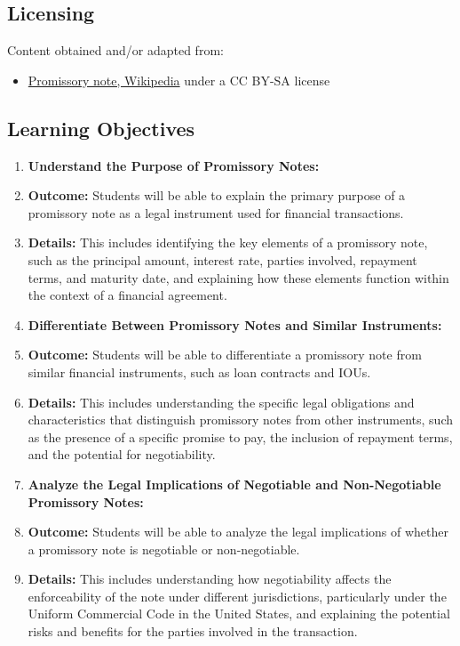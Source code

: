 \subsection{Licensing}
\label{sss:lice-7352}




Content obtained and/or adapted from:



\begin{itemize}
    \item \href{https://en.wikipedia.org/wiki/Promissory_note}{Promissory note, Wikipedia} under a CC BY-SA license
\end{itemize}


\subsection{Learning Objectives}
\label{ssec:lear-fe6e}


\begin{enumerate}
    \item \textbf{Understand the Purpose of Promissory Notes:}
    \item \textbf{Outcome:} Students will be able to explain the primary purpose of a promissory note as a legal instrument used for financial transactions.
    \item \textbf{Details:} This includes identifying the key elements of a promissory note, such as the principal amount, interest rate, parties involved, repayment terms, and maturity date, and explaining how these elements function within the context of a financial agreement.
    \item \textbf{Differentiate Between Promissory Notes and Similar Instruments:}
    \item \textbf{Outcome:} Students will be able to differentiate a promissory note from similar financial instruments, such as loan contracts and IOUs.
    \item \textbf{Details:} This includes understanding the specific legal obligations and characteristics that distinguish promissory notes from other instruments, such as the presence of a specific promise to pay, the inclusion of repayment terms, and the potential for negotiability.
    \item \textbf{Analyze the Legal Implications of Negotiable and Non-Negotiable Promissory Notes:}
    \item \textbf{Outcome:} Students will be able to analyze the legal implications of whether a promissory note is negotiable or non-negotiable.
    \item \textbf{Details:} This includes understanding how negotiability affects the enforceability of the note under different jurisdictions, particularly under the Uniform Commercial Code in the United States, and explaining the potential risks and benefits for the parties involved in the transaction.
\end{enumerate}


